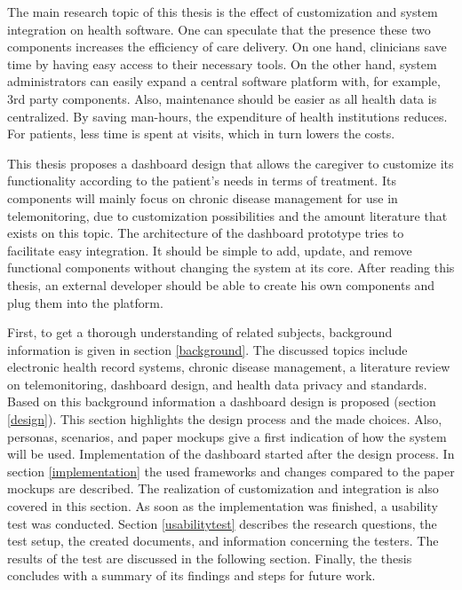 The main research topic of this thesis is the effect of customization and system integration on health software. One can speculate that the presence these two components increases the efficiency of care delivery. On one hand, clinicians save time by having easy access to their necessary tools. On the other hand, system administrators can easily expand a central software platform with, for example, 3rd party components. Also, maintenance should be easier as all health data is centralized. By saving man-hours, the expenditure of health institutions reduces. For patients, less time is spent at visits, which in turn lowers the costs.

This thesis proposes a dashboard design that allows the caregiver to customize its functionality according to the patient's needs in terms of treatment. Its components will mainly focus on chronic disease management for use in telemonitoring, due to customization possibilities and the amount literature that exists on this topic. The architecture of the dashboard prototype tries to facilitate easy integration. It should be simple to add, update, and remove functional components without changing the system at its core. After reading this thesis, an external developer should be able to create his own components and plug them into the platform. 

First, to get a thorough understanding of related subjects, background information is given in section \ref{background}. The discussed topics include electronic health record systems, chronic disease management, a literature review on telemonitoring, dashboard design, and health data privacy and standards. Based on this background information a dashboard design is proposed (section \ref{design}). This section highlights the design process and the made choices. Also, personas, scenarios, and paper mockups give a first indication of how the system will be used. Implementation of the dashboard started after the design process. In section \ref{implementation} the used frameworks and changes compared to the paper mockups are described. The realization of customization and integration is also covered in this section. As soon as the implementation was finished, a usability test was conducted. Section \ref{usabilitytest} describes the research questions, the test setup, the created documents, and information concerning the testers. The results of the test are discussed in the following section. Finally, the thesis concludes with a summary of its findings and steps for future work.
